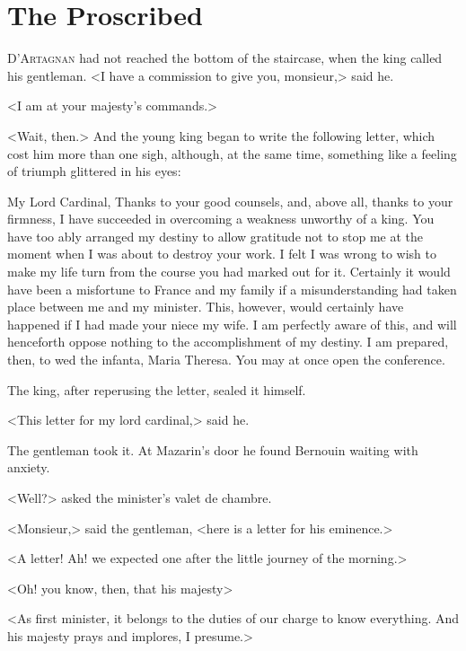 \chapter{The Proscribed}

\lettrine{D}{'Artagnan} had not reached the bottom of the staircase, when the king called his gentleman. <I have a commission to give you, monsieur,> said he.

\zz
<I am at your majesty's commands.>

\zz
<Wait, then.> And the young king began to write the following letter, which cost him more than one sigh, although, at the same time, something like a feeling of triumph glittered in his eyes:

\vspace{-1em}

\begin{mail}{}{My Lord Cardinal,}
Thanks to your good counsels, and, above all, thanks to your firmness, I have succeeded in overcoming a weakness unworthy of a king. You have too ably arranged my destiny to allow gratitude not to stop me at the moment when I was about to destroy your work. I felt I was wrong to wish to make my life turn from the course you had marked out for it. Certainly it would have been a misfortune to France and my family if a misunderstanding had taken place between me and my minister. This, however, would certainly have happened if I had made your niece my wife. I am perfectly aware of this, and will henceforth oppose nothing to the accomplishment of my destiny. I am prepared, then, to wed the infanta, Maria Theresa. You may at once open the conference.
\end{mail}

The king, after reperusing the letter, sealed it himself.

<This letter for my lord cardinal,> said he.

The gentleman took it. At Mazarin's door he found Bernouin waiting with anxiety.

<Well?> asked the minister's valet de chambre.

<Monsieur,> said the gentleman, <here is a letter for his eminence.>

<A letter! Ah! we expected one after the little journey of the morning.>

<Oh! you know, then, that his majesty\longdash>

<As first minister, it belongs to the duties of our charge to know everything. And his majesty prays and implores, I presume.>

